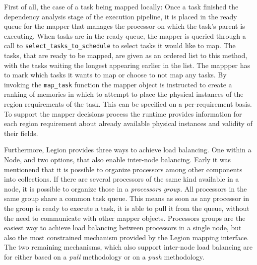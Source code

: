 \documentclass{article}      %
\begin{document}
First of all, the case of a task being mapped locally: Once a task finished the dependency analysis stage of the execution pipeline, it is placed in the ready queue for the mapper that manages the processor on which the task's parent is executing. When tasks are in the ready queue, the mapper is queried through a call to \lstinline{select_tasks_to_schedule} to select tasks it would like to map. The tasks, that are ready to be mapped, are given as an ordered list to this method, with the tasks waiting the longest appearing earlier in the list. The mappper has to mark which tasks it wants to map or choose to not map any tasks. By invoking the \lstinline{map_task} function the mapper object is instructed to create a ranking of memories in which to attempt to place the physical instances of the region requirements of the task. This can be specified on a per-requirement basis. To support the mapper decisions process the runtime provides information for each region requirement about already available physical instances and validity of their fields. 

Furthermore, Legion provides three ways to achieve load balancing. One within a Node, and two options, that also enable inter-node balancing. Early it was mentionend that it is possible to organize processors among other components into collections. If there are several processors of the same kind available in a node, it is possible to organize those in a \emph{processors group}. All processors in the same group share a common task queue. This means as soon as any processor in the group is ready to execute a task, it is able to pull it from the queue, without the need to communicate with other mapper objects. Processors groups are the easiest way to achieve load balancing between processors in a single node, but also the most constrained mechanism provided by the Legion mapping interface. 
The two remaining mechanisms, which also support inter-node load balancing are for either based on a \emph{pull} methodology or on a \emph{push} methodology.
\end{document}

